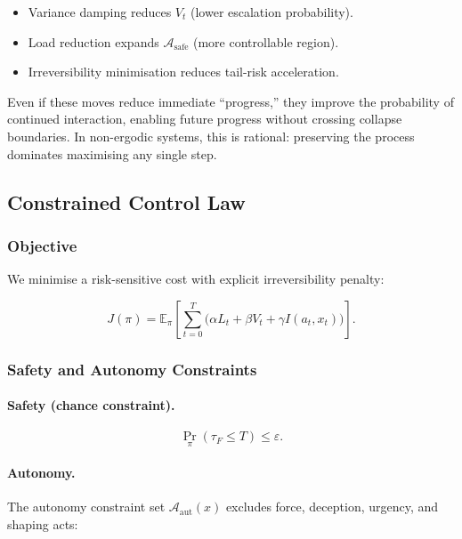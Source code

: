 \begin{itemize}
\item Variance damping reduces $V_t$ (lower escalation probability).
\item Load reduction expands $\mathcal{A}_{\mathrm{safe}}$ (more
controllable region).
\item Irreversibility minimisation reduces tail-risk acceleration.
\end{itemize}

\noindent
Even if these moves reduce immediate ``progress,'' they improve the
probability of continued interaction, enabling future progress
without crossing collapse boundaries. In non-ergodic systems, this
is rational: preserving the process dominates maximising any single
step.

\subsection{Constrained Control Law}
\label{sec:pp-constrained-control-law}

\subsubsection{Objective}
\label{sec:pp-objective}

We minimise a risk-sensitive cost with explicit irreversibility
penalty:

\begin{equation}
J(\pi) = \mathbb{E}_\pi\!\left[\sum_{t=0}^T
\bigl(\alpha L_t + \beta V_t + \gamma I(a_t, x_t)\bigr)\right].
\label{eq:pp-objective}
\end{equation}

\subsubsection{Safety and Autonomy Constraints}
\label{sec:pp-safety-autonomy}

\paragraph{Safety (chance constraint).}

\begin{equation}
\Pr_\pi(\tau_F \le T) \le \varepsilon.
\label{eq:pp-chance-constraint}
\end{equation}

\paragraph{Autonomy.}
The autonomy constraint set $\mathcal{A}_{\mathrm{aut}}(x)$ excludes
force, deception, urgency, and shaping acts:

